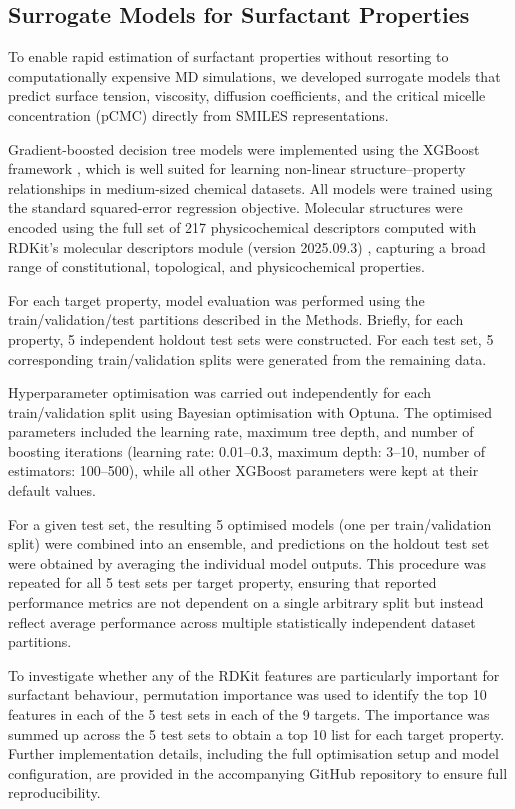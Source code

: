 \documentclass[letterpaper]{article}
\begin{document}
\subsection{Surrogate Models for Surfactant Properties}
\label{sec:methods:surrogate}

To enable rapid estimation of surfactant properties without resorting to computationally expensive MD simulations, we developed surrogate models that predict surface tension, viscosity, diffusion coefficients, and the critical micelle concentration (pCMC) directly from SMILES representations.

Gradient-boosted decision tree models were implemented using the XGBoost framework \cite{chen_xgboost_2016,boldini_practical_2023}, which is well suited for learning non-linear structure--property relationships in medium-sized chemical datasets. All models were trained using the standard squared-error regression objective. Molecular structures were encoded using the full set of 217 physicochemical descriptors computed with RDKit's molecular descriptors module (version 2025.09.3) \cite{landrum2006rdkit}, capturing a broad range of constitutional, topological, and physicochemical properties.

For each target property, model evaluation was performed using the train/validation/test partitions described in the Methods. Briefly, for each property, 5 independent holdout test sets were constructed. For each test set, 5 corresponding train/validation splits were generated from the remaining data.

Hyperparameter optimisation was carried out independently for each train/validation split using Bayesian optimisation with Optuna.\cite{optuna_2019} The optimised parameters included the learning rate, maximum tree depth, and number of boosting iterations (learning rate: 0.01--0.3, maximum depth: 3--10, number of estimators: 100--500), while all other XGBoost parameters were kept at their default values.

For a given test set, the resulting 5 optimised models (one per train/validation split) were combined into an ensemble, and predictions on the holdout test set were obtained by averaging the individual model outputs. This procedure was repeated for all 5 test sets per target property, ensuring that reported performance metrics are not dependent on a single arbitrary split but instead reflect average performance across multiple statistically independent dataset partitions.

To investigate whether any of the RDKit features are particularly important for surfactant behaviour, permutation importance was used to identify the top 10 features in each of the 5 test sets in each of the 9 targets. The importance was summed up across the 5 test sets to obtain a top 10 list for each target property. Further implementation details, including the full optimisation setup and model configuration, are provided in the accompanying GitHub repository to ensure full reproducibility.
\end{document}
